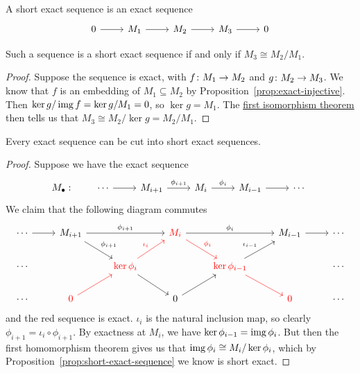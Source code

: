 \begin{definition}
    A short exact sequence is an exact sequence
    \begin{equation*}
        \begin{tikzcd}
            0 \arrow{r} & M_1 \arrow{r} & M_2 \arrow{r} & M_3 \arrow{r} & 0
        \end{tikzcd}
    \end{equation*}
\end{definition}
\begin{proposition}\label{prop:short-exact-sequence}
    Such a sequence is a short exact sequence if and only if \(M_3 \cong M_2/M_1\).
\end{proposition}
\begin{proof}
    Suppose the sequence is exact, with \(f\colon M_1\to M_2\) and \(g\colon M_2\to M_3\).
    We know that \(f\) is an embedding of \(M_1 \subseteq M_2\) by Proposition~\ref{prop:exact-injective}.
    Then \(\ker g/\operatorname{img} f = \ker g/M_1 = 0\), so \(\ker g = M_1\).
    The \hyperref[thm:iso-1-mod]{first isomorphism theorem} then tells us that
    \(M_3 \cong M_2/\ker g = M_2/M_1\).
\end{proof}
\begin{theorem}\label{thm:cut-exact-sequence}
    Every exact sequence can be cut into short exact sequences.
\end{theorem}
\begin{proof}
    Suppose we have the exact sequence
    \begin{equation*}
        M_\bullet: \qquad
        \begin{tikzcd}
            \cdots \arrow{r} & M_{i+1} \arrow{r}{\phi_{i+1}} &
            M_i \arrow{r}{\phi_i} & M_{i-1} \arrow{r} & \cdots
        \end{tikzcd}
    \end{equation*}
    We claim that the following diagram commutes
    \begin{equation*}
        \begin{tikzcd}
            \cdots \arrow{r} & M_{i+1} \arrow{rr}{\phi_{i+1}} \arrow{rd}{\phi_{i+1}} &&
            \textcolor{red}{M_i} \arrow{rr}{\phi_i} \arrow[color=red]{rd}{\phi_i} &&
            M_{i-1} \arrow{r} & \cdots \\
            \cdots && \textcolor{red}{\ker\phi_i} \arrow[color=red]{ru}{\iota_i} \arrow{rd} &&
            \textcolor{red}{\ker\phi_{i-1}} \arrow{ru}{\iota_{i-1}} \arrow[color=red]{rd} && \cdots \\
            \cdots & \textcolor{red}{0} \arrow[color=red]{ru} && 0 \arrow{ru} &&
            \textcolor{red}{0} & \cdots
        \end{tikzcd}
    \end{equation*}
    and the red sequence is exact.
    \(\iota_i\) is the natural inclusion map,
    so clearly \(\phi_{i+1} = \iota_i \circ \phi_{i+1}\).
    By exactness at \(M_i\), we have \(\ker\phi_{i-1} = \operatorname{img}\phi_i\).
    But then the first homomorphism theorem gives us that \(\operatorname{img}\phi_i \cong M_i/\ker\phi_i\),
    which by Proposition~\ref{prop:short-exact-sequence} we know is short exact.
\end{proof}

